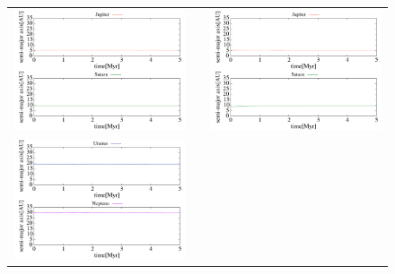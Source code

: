 \documentclass[11pt,a4paper,oneside,onecolumn]{jarticle}
\begin{document}
\begin{figure}[H]
\begin{tabular}{ccc}
\begin{minipage}[t]{0.45\hsize}
\centering
\includegraphics[width=8cm]{./image/NoMove_axis_5Myr_JUPSAT.pdf}
\end{minipage} &
\begin{minipage}[t]{0.1\hsize}
\end{minipage} &
\begin{minipage}[t]{0.45\hsize}
\centering
\includegraphics[width=8cm]{./image/Move500kyr_axis_5Myr_JUPSAT.pdf}
\end{minipage}\\
\begin{minipage}[t]{0.45\hsize}
\centering
\includegraphics[width=8cm]{./image/NoMove_axis_5Myr_URANEP.pdf}
\end{minipage} &

\end{tabular}
\end{figure}
\end{document}
